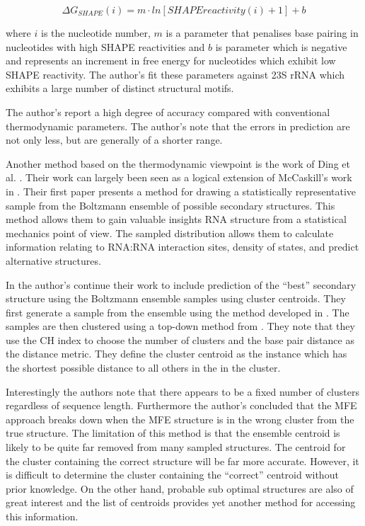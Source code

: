 \documentclass[journal]{IEEEtran}
\begin{document}
\begin{equation}
	\Delta G_{SHAPE}(i) = m \cdot ln[SHAPEreactivity(i) + 1] + b
\end{equation}

where $i$ is the nucleotide number, $m$ is a parameter that penalises base pairing in nucleotides with high SHAPE reactivities and $b$ is parameter which is negative and represents an increment in free energy for nucleotides which exhibit low SHAPE reactivity. The author's fit these parameters against 23S rRNA which exhibits a large number of distinct structural motifs.

The author's report a high degree of accuracy compared with conventional thermodynamic parameters. The author's note that the errors in prediction are not only less, but are generally of a shorter range.

Another method based on the thermodynamic viewpoint is the work of Ding et al. \cite{ding2003statistical, ding2005rna}. Their work can largely been seen as a logical extension of McCaskill's work in \cite{mccaskill1990equilibrium}. Their first paper \cite{ding2003statistical} presents a method for drawing a statistically representative sample from the Boltzmann ensemble of possible secondary structures. This method allows them to gain valuable insights RNA structure from a statistical mechanics point of view. The sampled distribution allows them to calculate information relating to RNA:RNA interaction sites, density of states, and predict alternative structures.

In \cite{ding2005rna} the author's continue their work to include prediction of the ``best'' secondary structure using the Boltzmann ensemble samples using cluster centroids. They first generate a sample from the ensemble using the method developed in \cite{ding2003statistical}. The samples are then clustered using a top-down method from \cite{rousseeuw1990finding}. They note that they use the CH index to choose the number of clusters and the base pair distance as the distance metric. They define the cluster centroid as the instance which has the shortest possible distance to all others in the in the cluster.

Interestingly the authors note that there appears to be a fixed number of clusters regardless of sequence length. Furthermore the author's concluded that the MFE approach breaks down when the MFE structure is in the wrong cluster from the true structure. The limitation of this method is that the ensemble centroid is likely to be quite far removed from many sampled structures. The centroid for the cluster containing the correct structure will be far more accurate. However, it is difficult to determine the cluster containing the ``correct'' centroid without prior knowledge. On the other hand, probable sub optimal structures are also of great interest and the list of centroids provides yet another method for accessing this information.
\end{document}
